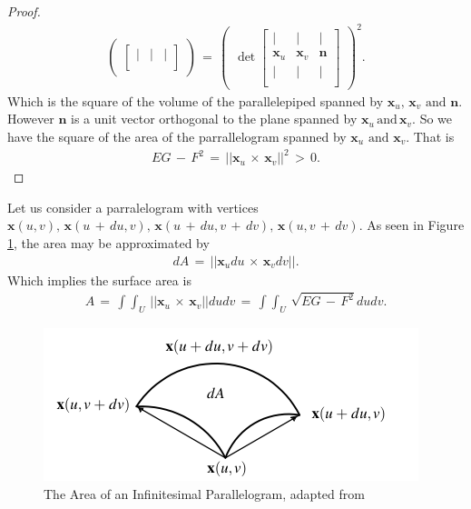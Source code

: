 \documentclass{UKZNcomp}
\newcommand{\vect}[1]{\mathbf{#1}} %
\theoremstyle{definition}
\theoremstyle{remark}
\begin{document}
\begin{proof}
\begin{align*}
\begin{pmatrix}
\begin{bmatrix}
    | & | & |\\
\end{bmatrix}
\end{pmatrix}
\,=\,
\begin{pmatrix}\det
\begin{bmatrix}
    | & | & |\\
    \vect x_u & \vect x_v & \vect{n}\\
    | & | & |\\
\end{bmatrix}
\end{pmatrix}^2.
\end{align*}
Which is the square of the volume of the parallelepiped spanned by $\vect x_u,\, \vect x_v\, \,\text{and}\,\, \vect{n}$. However $\vect{n}$ is a unit vector orthogonal to the plane spanned by $\vect x_u\,\text{and}\,\vect x_v$. So we have the square of the area of the parrallelogram spanned by $\vect x_u\,\,\text{and}\,\,\vect x_v$. That is
\begin{align*}
EG\,-\,F^2\,=\,\lvert\lvert\vect x_u\,\times\,\vect x_v\rvert\rvert^2 \,>\,0.
\end{align*}
\end{proof}

Let us consider a parralelogram with vertices $\vect{x}(u,v),\,\vect{x}(u\,+\,du,v),\,\vect{x}(u\,+\,du,v\,+\,dv),\,\vect{x}(u,v\,+\,dv)$. As seen in Figure \ref{fig:AreaParm}, the area may be approximated by
\begin{align*}
dA\,=\,\lvert\lvert\vect x_udu\,\times\,\vect x_vdv\rvert\rvert.
\end{align*}
Which implies the surface area is
\begin{align*}
A\,=\,\int\int_U\,\lvert\lvert\vect x_u\,\times\,\vect x_v\rvert\rvert dudv\,=\,\int\int_U\,\sqrt{EG\,-\,F^2} dudv.
\end{align*}

\begin{figure}[H]
    \centerline{\includegraphics[scale=1]{AreaParm}}
    \caption[Approximating the Area of an Infinitesimal Parallelogram]{\label{fig:AreaParm}
    The Area of an Infinitesimal Parallelogram, adapted from \cite{MIT}}
\end{figure}
\end{document}
